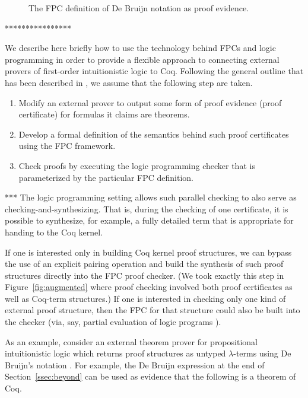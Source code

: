 \begin{figure}


\caption{The FPC definition of De Bruijn notation as proof evidence.}
\label{fig:debruijn}
\end{figure}


****************


We describe here briefly how to use the technology behind FPCs and
logic programming in order to provide a flexible approach to
connecting external provers of first-order intuitionistic logic to
Coq.
%
Following the general outline that has been described in
\cite{blanco17cade,blanco20coq}, we assume that the following step are
taken.
%
\begin{enumerate}
\item Modify an external prover to output some form of proof evidence
  (proof certificate) for formulas it claims are theorems.

\item Develop a formal definition of the semantics behind such proof
  certificates using the FPC framework.

\item Check proofs by executing the logic programming checker that is
  parameterized by the particular FPC definition.
\end{enumerate}
%
***
The logic programming setting allows such parallel checking
to also serve as checking-and-synthesizing.  That is, during the
checking of one certificate, it is possible to synthesize, for
example, a fully detailed term that is appropriate for handing to the
Coq kernel.

If one is interested only in building Coq kernel proof structures, we
can bypass the use of an explicit pairing operation and build the
synthesis of such proof structures directly into the FPC proof
checker.  (We took exactly this step in Figure~\ref{fig:augmented}
where proof checking involved both proof certificates as well as
Coq-term structures.)  If one is interested in checking only one kind
of external proof structure, then the FPC for that structure could
also be built into the checker (via, say, partial evaluation of logic
programs \cite{lloyd91jlp}).

As an example, consider an external theorem prover for propositional
intuitionistic logic which returns proof structures as untyped
$\lambda$-terms using De Bruijn's notation \cite{}.  For example, the
De Bruijn expression at the end of Section~\ref{ssec:beyond} can be
used as evidence that the following is a theorem of Coq.

